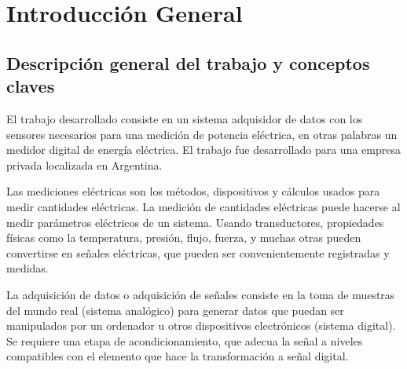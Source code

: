 
\chapter{Introducción General} %

\label{Chapter1} %
\label{IntroGeneral}


\newcommand{\keyword}[1]{\textbf{#1}}
\newcommand{\tabhead}[1]{\textbf{#1}}
\newcommand{\code}[1]{\texttt{#1}}
\newcommand{\file}[1]{\texttt{\bfseries#1}}
\newcommand{\option}[1]{\texttt{\itshape#1}}
\newcommand{\grados}{$^{\circ}$}



\section{Descripción general del trabajo y conceptos claves}

El trabajo desarrollado consiste en un sistema adquisidor de datos con los sensores necesarios para una medición de potencia eléctrica, en otras palabras un medidor digital de energía eléctrica. El trabajo fue desarrollado para una empresa privada localizada en Argentina.

Las mediciones eléctricas son los métodos, dispositivos y cálculos usados para medir cantidades eléctricas. La medición de cantidades eléctricas puede hacerse al medir parámetros eléctricos de un sistema. Usando transductores, propiedades físicas como la temperatura, presión, flujo, fuerza, y muchas otras pueden convertirse en señales eléctricas, que pueden ser convenientemente registradas y medidas. 


La adquisición de datos o adquisición de señales consiste en la toma de muestras del mundo real (sistema analógico) para generar datos que puedan ser manipulados por un ordenador u otros dispositivos electrónicos (sistema digital). Se requiere una etapa de acondicionamiento, que adecua la señal a niveles compatibles con el elemento que hace la transformación a señal digital.\cite{NIDataAdquisition}

